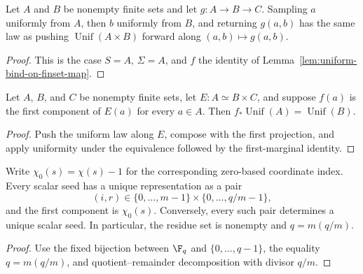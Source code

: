 \begin{lemma}\label{lem:uniform-bind-map}
	\leanok
	Let $A$ and $B$ be nonempty finite sets and let $g\colon A\to B\to C$.
	Sampling $a$ uniformly from $A$, then $b$ uniformly from $B$, and returning
	$g(a,b)$ has the same law as pushing $\operatorname{Unif}(A\times B)$ forward
	along $(a,b)\mapsto g(a,b)$.
\end{lemma}
\begin{proof}
	\leanok
	This is the case $S=A$, $\Sigma=A$, and $f$ the identity of
	Lemma~\ref{lem:uniform-bind-on-finset-map}.
\end{proof}

\begin{lemma}
	\label{lem:uniform-first-marginal-after-equivalence}
	\leanok
	Let $A$, $B$, and $C$ be nonempty finite sets, let $E\colon A\simeq B\times C$,
	and suppose $f(a)$ is the first component of $E(a)$ for every $a\in A$. Then
	$f_\ast\operatorname{Unif}(A)=\operatorname{Unif}(B)$.
\end{lemma}
\begin{proof}
	\leanok
	Push the uniform law along $E$, compose with the first projection, and apply
	uniformity under the equivalence followed by the first-marginal identity.
\end{proof}

\begin{lemma}\label{lem:chi-seed-fibers}
	\leanok
	Write $\chi_0(s)=\chi(s)-1$ for the corresponding zero-based coordinate
	index. Every scalar seed has a unique
	representation as a pair
	\[
		(i,r)\in\{0,\ldots,m-1\}\times\{0,\ldots,q/m-1\},
	\]
	and the first component is $\chi_0(s)$. Conversely, every such pair determines
	a unique scalar seed. In particular, the residue set is nonempty and
	$q=m(q/m)$.
\end{lemma}
\begin{proof}
	\leanok
	Use the fixed bijection between $\F_q$ and $\{0,\ldots,q-1\}$, the equality
	$q=m(q/m)$, and quotient--remainder decomposition with divisor $q/m$.
\end{proof}

